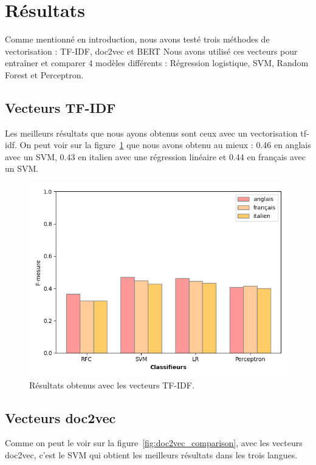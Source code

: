 \section{Résultats}

Comme mentionné en introduction, nous avons testé trois méthodes de vectorisation : TF-IDF, doc2vec et BERT
Nous avons utilisé ces vecteurs pour entraîner et comparer 4 modèles différents : Régression logistique, SVM, Random Forest et Perceptron.

\subsection{Vecteurs TF-IDF}

Les meilleurs résultats que nous ayons obtenus sont ceux avec un vectorisation tf-idf.
On peut voir sur la figure~\ref{fig:tfidf_comparison} que nous avons obtenu au mieux : 0.46 en anglais avec un SVM, 0.43 en italien avec une régression linéaire et 0.44 en français avec un SVM.

\begin{figure}[t]
  \includegraphics[width=\columnwidth]{assets/comparaison_metriques_tfidf.png}
  \caption{Résultats obtenus avec les vecteurs TF-IDF.}
  \label{fig:tfidf_comparison}
\end{figure}

\subsection{Vecteurs doc2vec}

Comme on peut le voir sur la figure~\ref{fig:doc2vec_comparison}, avec les vecteurs doc2vec, c'est le SVM qui obtient les meilleurs résultats dans les trois langues.

